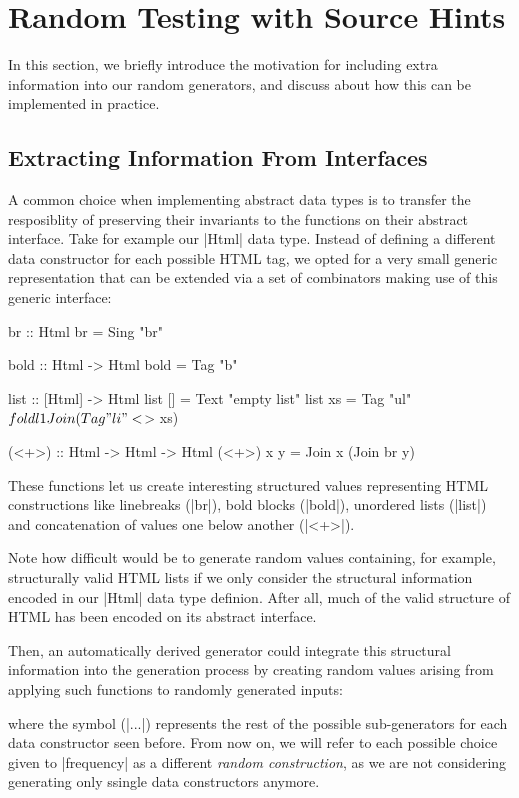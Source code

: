 \section{Random Testing with Source Hints}
\label{sec:sources}

In this section, we briefly introduce the motivation for including extra
information into our random generators, and discuss about how this can be
implemented in practice.


%
\subsection{Extracting Information From Interfaces}

A common choice when implementing abstract data types is to transfer the
resposiblity of preserving their invariants to the functions on their abstract
interface.
%
Take for example our |Html| data type.
%
Instead of defining a different data constructor for each possible HTML tag, we
opted for a very small generic representation that can be extended via a set of
combinators making use of this generic interface:

\begin{code}
br :: Html
br = Sing "br"

bold :: Html -> Html
bold = Tag "b"

list :: [Html] -> Html
list []  = Text "empty list"
list xs  = Tag "ul" $ foldl1 Join (Tag "li" <$> xs)

(<+>) :: Html -> Html -> Html
(<+>) x y = Join x (Join br y)
\end{code} %
%
These functions let us create interesting structured values representing HTML
constructions like linebreaks (|br|), bold blocks (|bold|), unordered lists
(|list|) and concatenation of values one below another (|<+>|).

Note how difficult would be to generate random values containing, for example,
structurally valid HTML lists if we only consider the structural information
encoded in our |Html| data type definion.
%
After all, much of the valid structure of HTML has been encoded on its abstract
interface.

Then, an automatically derived generator could integrate this structural
information into the generation process by creating random values arising from
applying such functions to randomly generated inputs:

%
where the symbol (|...|) represents the rest of the possible sub-generators for
each data constructor seen before.
%
From now on, we will refer to each possible choice given to |frequency| as a
different \emph{random construction}, as we are not considering generating only
ssingle data constructors anymore.

